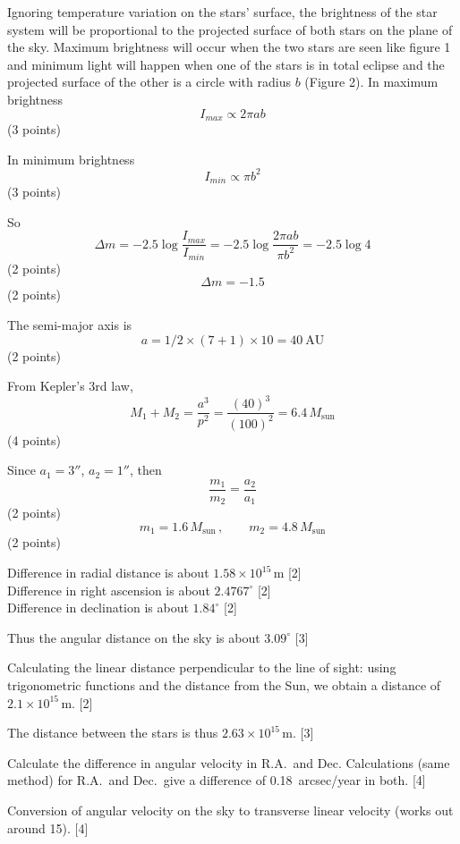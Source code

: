 Ignoring temperature variation on the stars' surface, the brightness of the
star system will be proportional to the projected surface of both stars on the
plane of the sky. Maximum brightness will occur when the two stars are seen
like figure 1 and minimum light will happen when one of the stars is in total
eclipse and the projected surface of the other is a circle with radius $b$
(Figure 2). In maximum brightness
\[ I_{max} \propto 2\pi a b \]
\hfill(3 points)

In minimum brightness
\[ I_{min} \propto \pi b^2 \]
\hfill(3 points)

So
\[ \Delta m = -2.5\log\frac{I_{max}}{I_{min}}
   = -2.5\log\frac{2\pi ab}{\pi b^2}
   = -2.5\log 4 \]
\hfill(2 points)
\[ \Delta m = -1.5 \]
\hfill(2 points)

The semi-major axis is
\[ a = 1/2 \times (7 + 1) \times 10 = 40\ \mathrm{AU} \]
\hfill(2 points)

From Kepler's 3rd law,
\[ M_1 + M_2 = \frac{a^3}{p^2} = \frac{(40)^3}{(100)^2}
   = 6.4\,M_{\mathrm{sun}} \]
\hfill(4 points)

Since $a_1 = 3''$, $a_2 = 1''$, then
\[ \frac{m_1}{m_2} = \frac{a_2}{a_1} \]
\hfill(2 points)
\[ m_1 = 1.6\,M_{\mathrm{sun}}\,,\qquad m_2 = 4.8\,M_{\mathrm{sun}} \]
\hfill(2 points)


Difference in radial distance is about $1.58 \times 10^{15}$\,m
\hfill[2]\\
Difference in right ascension is about $2.4767^\circ$ \hfill[2]\\
Difference in declination is about $1.84^\circ$ \hfill[2]

Thus the angular distance on the sky is about $3.09^\circ$ \hfill[3]

Calculating the linear distance perpendicular to the line of sight:
using trigonometric functions and the distance from the Sun, we obtain a
distance of $2.1 \times 10^{15}$\,m. \hfill[2]

The distance between the stars is thus $2.63 \times 10^{15}$\,m. \hfill[3]

Calculate the difference in angular velocity in R.A.\ and Dec. Calculations
(same method) for R.A.\ and Dec.\ give a difference of 0.18\ arcsec/year in
both. \hfill[4]

Conversion of angular velocity on the sky to transverse linear velocity
(works out around 15). \hfill[4]

